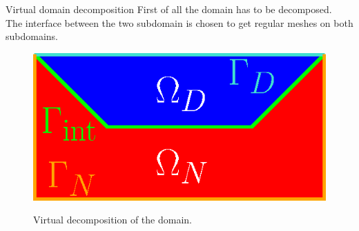 \documentclass[aspectratio=169]{ISAE-Beamer}
\begin{document}
\begin{frame}{Virtual domain decomposition}
First of all the domain has to be decomposed. \\

The interface between the two subdomain is chosen to get regular meshes on both subdomains.
\begin{figure}[t]%
\centering
\includegraphics[width=0.5\columnwidth]{part_3/applications/mixed_bd_waves/dom_split.eps} \\
\caption{Virtual decomposition of the domain.}
\end{figure}
\end{frame}
\end{document}
